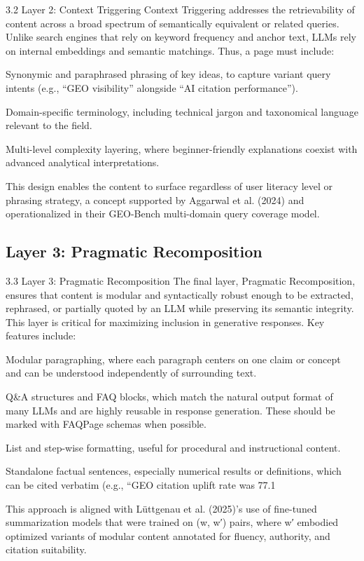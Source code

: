 3.2 Layer 2: Context Triggering
Context Triggering addresses the retrievability of content across a broad spectrum of semantically equivalent or related queries. Unlike search engines that rely on keyword frequency and anchor text, LLMs rely on internal embeddings and semantic matchings. Thus, a page must include:

Synonymic and paraphrased phrasing of key ideas, to capture variant query intents (e.g., “GEO visibility” alongside “AI citation performance”).

Domain-specific terminology, including technical jargon and taxonomical language relevant to the field.

Multi-level complexity layering, where beginner-friendly explanations coexist with advanced analytical interpretations.

This design enables the content to surface regardless of user literacy level or phrasing strategy, a concept supported by Aggarwal et al. (2024) and operationalized in their GEO-Bench multi-domain query coverage model.
\subsection{Layer 3: Pragmatic Recomposition}

3.3 Layer 3: Pragmatic Recomposition
The final layer, Pragmatic Recomposition, ensures that content is modular and syntactically robust enough to be extracted, rephrased, or partially quoted by an LLM while preserving its semantic integrity. This layer is critical for maximizing inclusion in generative responses. Key features include:

Modular paragraphing, where each paragraph centers on one claim or concept and can be understood independently of surrounding text.

Q&A structures and FAQ blocks, which match the natural output format of many LLMs and are highly reusable in response generation. These should be marked with FAQPage schemas when possible.

List and step-wise formatting, useful for procedural and instructional content.

Standalone factual sentences, especially numerical results or definitions, which can be cited verbatim (e.g., “GEO citation uplift rate was 77.1%

This approach is aligned with Lüttgenau et al. (2025)’s use of fine-tuned summarization models that were trained on (w, w′) pairs, where w′ embodied optimized variants of modular content annotated for fluency, authority, and citation suitability.
